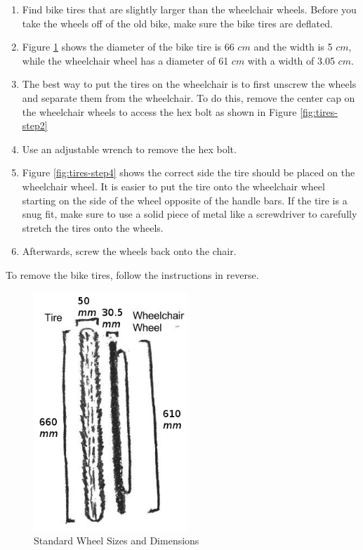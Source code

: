 \documentclass[12pt]{report}
\begin{document}
\begin{enumerate}
    \item Find bike tires that are slightly larger than the wheelchair wheels. Before
        you take the wheels off of the old bike, make sure the bike tires are
        deflated.
    \item Figure \ref{fig:tires-dimen} shows the diameter of the bike tire is 66
        $cm$ and the width is 5 $cm$, while the wheelchair wheel has a diameter
        of 61 $cm$ with a width of 3.05 $cm$.
    \item The best way to put the tires on the wheelchair is to first unscrew the
        wheels and separate them from the wheelchair. To do this, remove the center
        cap on the wheelchair wheels to access the hex bolt as shown in
        Figure \ref{fig:tires-step2}
    \item Use an adjustable wrench to remove the hex bolt.
    \item Figure \ref{fig:tires-step4} shows the correct side the tire should be
        placed on the wheelchair wheel. It is easier to put the tire onto the
        wheelchair wheel starting on the side of the wheel opposite of the handle bars.
        If the tire is a snug fit, make sure to use a solid piece of metal like a
        screwdriver to carefully stretch the tires onto the wheels.
    \item Afterwards, screw the wheels back onto the chair.
\end{enumerate}

To remove the bike tires, follow the instructions in reverse.

\begin{figure}[H]
    \centering
    \includegraphics[height=9cm]{tires/dimen}
    \caption{Standard Wheel Sizes and Dimensions}
    \label{fig:tires-dimen}
\end{figure}
\end{document}
